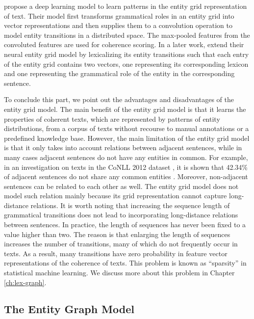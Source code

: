  propose a deep learning model to learn patterns in the entity grid representation of text. 
Their model first transforms grammatical roles in an entity grid into vector representations and then supplies them to a convolution operation to model entity transitions in a distributed space. 
The max-pooled features from the convoluted features are used for coherence scoring. 
In a later work,  extend their neural entity grid model by lexicalizing its entity transitions such that each entry of the entity grid contains two vectors, one representing its corresponding lexicon and one representing the grammatical role of the entity in the corresponding sentence.  

To conclude this part, we point out the advantages and disadvantages of the entity grid model. 
The main benefit of the entity grid model is that it learns the properties of coherent texts, which are represented by patterns of entity distributions, from a corpus of texts without recourse to manual annotations or a predefined knowledge base. 
However, the main limitation of the entity grid model is that it only takes into account relations between adjacent sentences, while in many cases adjacent sentences do not have any entities in common. 
For example, in an investigation on texts in the CoNLL 2012 dataset \cite{pradhan12}, it is shown that 42.34\% of adjacent sentences do not share any common entities \cite{zhangmuyu15}. 
Moreover, non-adjacent sentences can be related to each other as well. 
The entity grid model does not model such relation mainly because its grid representation cannot capture long-distance relations.  
It is worth noting that increasing the sequence length of grammatical transitions does not lead to incorporating long-distance relations between sentences.  
In practice, the length of sequences has never been fixed to a value higher than two. 
The reason is that enlarging the length of sequences increases the number of transitions, many of which do not frequently occur in texts. 
As a result, many transitions have zero probability in feature vector representations of the coherence of texts. 
This problem is known as ``sparsity'' in statistical machine learning. 
We discuss more about this problem in Chapter \ref{ch:lex-graph}. 

\subsection{The Entity Graph Model}
\label{sec:ent_graph}

